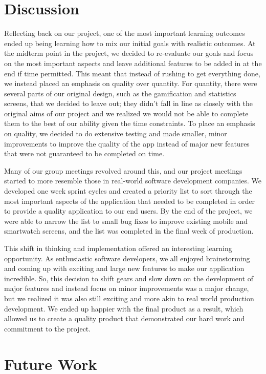\documentclass{sigchi}
\begin{document}
\section{Discussion}

Reflecting back on our project, one of the most important learning outcomes
ended up being learning how to mix our initial goals with realistic outcomes.
At the midterm point in the project, we decided to re-evaluate our goals and
focus on the most important aspects and leave additional features to be added
in at the end if time permitted. This meant that instead of rushing to get
everything done, we instead placed an emphasis on quality over quantity. For
quantity, there were several parts of our original design, such as the
gamification and statistics screens, that we decided to leave out; they
didn’t fall in line as closely with the original aims of our project and we
realized we would not be able to complete them to the best of our ability
given the time constraints. To place an emphasis on quality, we decided to do
extensive testing and made smaller, minor improvements to improve the quality
of the app instead of major new features that were not guaranteed to be
completed on time.

Many of our group meetings revolved around this, and our project meetings
started to more resemble those in real-world software development companies. We
developed one week sprint cycles and created a priority list to sort through
the most important aspects of the application that needed to be completed in
order to provide a quality application to our end users. By the end of the
project, we were able to narrow the list to small bug fixes to improve existing
mobile and smartwatch screens, and the list was completed in the final week of
production. 

This shift in thinking and implementation offered an interesting learning
opportunity. As enthusiastic software developers, we all enjoyed brainstorming
and coming up with exciting and large new features to make our application
incredible. So, this decision to shift gears and slow down on the development
of major features and instead focus on minor improvements was a major change,
but we realized it was also still exciting and more akin to real world
production development. We ended up happier with the final product as a result,
which allowed us to create a quality product that demonstrated our hard work
and commitment to the project.


\section{Future Work}
\end{document}
